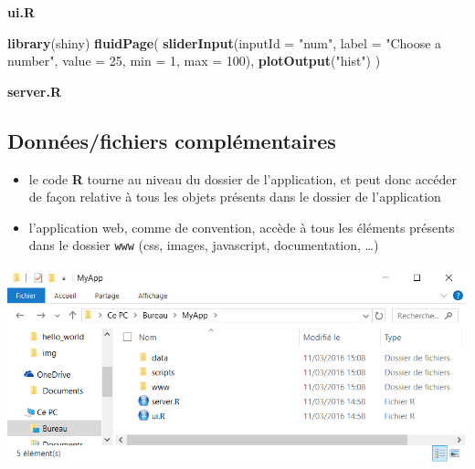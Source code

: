 \documentclass[
]{article}
\newenvironment{Shaded}{\begin{snugshade}}{\end{snugshade}}
\newcommand{\AttributeTok}[1]{\textcolor[rgb]{0.13,0.29,0.53}{#1}}
\newcommand{\ControlFlowTok}[1]{\textcolor[rgb]{0.13,0.29,0.53}{\textbf{#1}}}
\newcommand{\DecValTok}[1]{\textcolor[rgb]{0.00,0.00,0.81}{#1}}
\newcommand{\FunctionTok}[1]{\textcolor[rgb]{0.13,0.29,0.53}{\textbf{#1}}}
\newcommand{\NormalTok}[1]{#1}
\newcommand{\OtherTok}[1]{\textcolor[rgb]{0.56,0.35,0.01}{#1}}
\newcommand{\SpecialCharTok}[1]{\textcolor[rgb]{0.81,0.36,0.00}{\textbf{#1}}}
\newcommand{\StringTok}[1]{\textcolor[rgb]{0.31,0.60,0.02}{#1}}
\providecommand{\tightlist}{%
  \setlength{\itemsep}{0pt}\setlength{\parskip}{0pt}}
\begin{document}
\textbf{ui.R}

\begin{Shaded}
\begin{Highlighting}[]
\FunctionTok{library}\NormalTok{(shiny)}
\FunctionTok{fluidPage}\NormalTok{(}
  \FunctionTok{sliderInput}\NormalTok{(}\AttributeTok{inputId =} \StringTok{"num"}\NormalTok{, }\AttributeTok{label =} \StringTok{"Choose a number"}\NormalTok{, }
              \AttributeTok{value =} \DecValTok{25}\NormalTok{, }\AttributeTok{min =} \DecValTok{1}\NormalTok{, }\AttributeTok{max =} \DecValTok{100}\NormalTok{),  }
  \FunctionTok{plotOutput}\NormalTok{(}\StringTok{"hist"}\NormalTok{)}
\NormalTok{)}
\end{Highlighting}
\end{Shaded}

\textbf{server.R}

\begin{Shaded}
\end{Shaded}

\hypertarget{donnuxe9esfichiers-compluxe9mentaires}{%
\subsection{Données/fichiers
complémentaires}\label{donnuxe9esfichiers-compluxe9mentaires}}

\begin{itemize}
\tightlist
\item
  le code \textbf{R} tourne au niveau du dossier de l'application, et
  peut donc accéder de façon relative à tous les objets présents dans le
  dossier de l'application
\item
  l'application web, comme de convention, accède à tous les éléments
  présents dans le dossier \texttt{www} (css, images, javascript,
  documentation, \ldots)
\end{itemize}

\includegraphics{img/more_apps.png}
\end{document}
